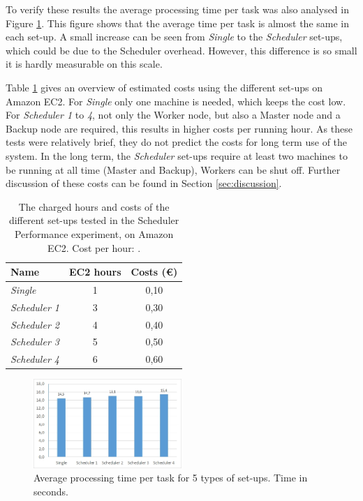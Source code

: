 \documentclass{acm_proc_article-sp}
\begin{document}
To verify these results the average processing time per task was also analysed in Figure \ref{fig:diagram_avg_image}.
This figure shows that the average time per task is almost the same in each set-up.
A small increase can be seen from \emph{Single} to the \emph{Scheduler} set-ups, which could be due to the Scheduler overhead.
However, this difference is so small it is hardly measurable on this scale.

Table \ref{tbl:costs} gives an overview of estimated costs using the different set-ups on Amazon EC2.
For \emph{Single} only one machine is needed, which keeps the cost low.
For \emph{Scheduler 1} to \emph{4}, not only the Worker node, but also a Master node and a Backup node are required, this results in higher costs per running hour.
As these tests were relatively brief, they do not predict the costs for long term use of the system.
In the long term, the \emph{Scheduler} set-ups require at least two machines to be running at all time (Master and Backup), Workers can be shut off.
Further discussion of these costs can be found in Section \ref{sec:discussion}.

\begin{table}
	\centering
	\begin{tabular}{| l | c | c |}
		\hline
		Name & EC2 hours & Costs (\euro) \\ \hline \hline
		\emph{Single} & 1 & 0,10 \\ \hline
		\emph{Scheduler 1} & 3 & 0,30 \\ \hline
		\emph{Scheduler 2} & 4 & 0,40 \\ \hline
		\emph{Scheduler 3} & 5 & 0,50 \\ \hline
		\emph{Scheduler 4} & 6 & 0,60 \\ \hline
	\end{tabular}
	\caption{The charged hours and costs of the different set-ups tested in the Scheduler Performance experiment, on Amazon EC2. Cost per hour: .}
	\label{tbl:costs}
\end{table}

\begin{figure}
	\centering
	\includegraphics[width=0.5\textwidth]{images/diagram_avg_image.jpg}
	\caption{Average processing time per task for 5 types of set-ups. Time in seconds.}
	\label{fig:diagram_avg_image}
\end{figure}
\end{document}
